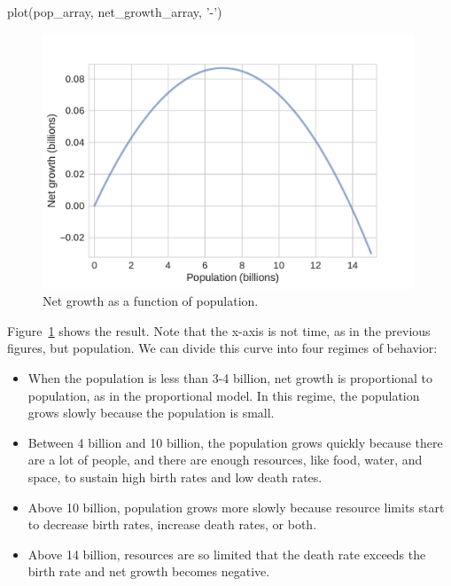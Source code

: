\documentclass[12pt]{book}
\theoremstyle{exercise}
\begin{document}
\begin{python}
plot(pop_array, net_growth_array, '-')
\end{python}

\begin{figure}
\centerline{\includegraphics[height=3in]{figs/chap03-fig05.pdf}}
\caption{Net growth as a function of population.}
\label{chap03-fig05}
\end{figure}

Figure~\ref{chap03-fig05} shows the result.  Note that the x-axis is not time, as in the previous figures, but population.  We can divide this curve into four regimes of behavior:

\begin{itemize}

\item When the population is less than 3-4 billion, net growth is proportional to population, as in the proportional model.  In this regime,  the population grows slowly because the population is small.

\item Between 4 billion and 10 billion, the population grows quickly because there are a lot of people, and there are enough resources, like food, water, and space, to sustain high birth rates and low death rates.

\item Above 10 billion, population grows more slowly because resource limits start to decrease birth rates, increase death rates, or both.

\item Above 14 billion, resources are so limited that the death rate exceeds the birth rate and net growth becomes negative.

\end{itemize}
\end{document}
